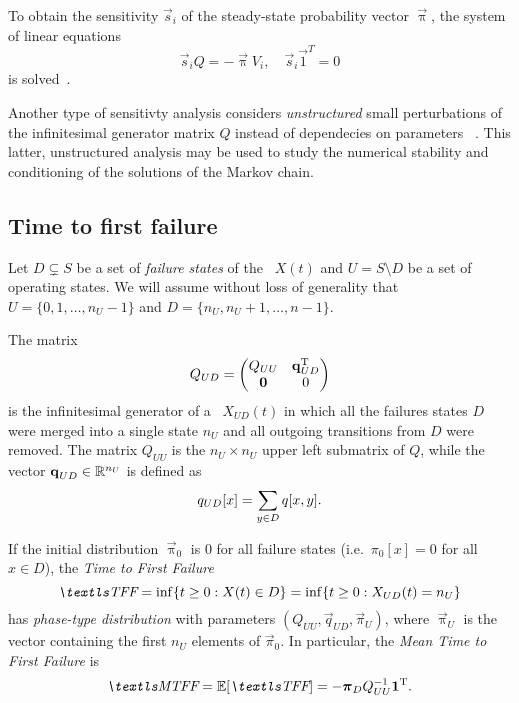 To obtain the sensitivity $\vec{s}_i$ of the steady-state probability
vector $\vec{\uppi}$, the system of linear equations
\begin{equation}
  \vec{s}_i Q = -\vec{\uppi} V_i, \quad \vec{s}_i \vec{1}^T = 0
\end{equation}
is solved~\citep{DBLP:conf/sigmetrics/BlakeRT88}.

Another type of sensitivty analysis considers \emph{unstructured}
small perturbations of the infinitesimal generator matrix $Q$ instead
of dependecies on parameters%
~\citep{funderlic1986sensitivity,ipsen1994uniform}. This latter,
unstructured analysis may be used to study the numerical stability and
conditioning of the solutions of the Markov chain.

\subsection{Time to first failure}

Let $D \subsetneq S$ be a set of \emph{failure states} of the \CTMC\ 
$X(t)$ and $U = S \setminus D$ be a set of operating states. We will
assume without loss of generality that $U = \{0, 1, \ldots, n_U - 1\}$
and $D = \{ n_U, n_U + 1, \ldots, n - 1 \}$.

The matrix
\begin{equation}
  Q_{UD} = \begin{pmatrix}
    Q_{UU} & \bm{\mathrm{q}}_{UD}^{\mathrm{T}} \\
    \bm{\mathrm{0}} & 0
  \end{pmatrix}
\end{equation}
is the infinitesimal generator of a \CTMC\ $X_{UD}(t)$ in which all
the failures states $D$ were merged into a single state $n_U$ and all
outgoing transitions from $D$ were removed. The matrix $Q_{UU}$ is the
$n_U \times n_U$ upper left submatrix of $Q$, while the vector
$\bm{\mathrm{q}}_{UD} \in \mathbb{R}^{n_U}$ is defined as
\begin{equation}
  q_{UD}[x] = \sum_{y \in D} q[x, y] \text.
\end{equation}

If the initial distribution $\vec{\uppi}_0$ is $0$ for all failure
states (i.e.~$\pi_0[x] = 0$ for all $x \in D$), the \emph{Time
  to First Failure}
\begin{equation}
  \TFF = \inf \{ t \ge 0 : X(t) \in D \} = \inf \{ t \ge 0 : X_{UD}(t)
  = n_U \}
\end{equation}
has \emph{phase-type distribution} with parameters
$(Q_{UU}, \vec{q}_{UD}, \vec{\pi}_{U})$, where $\vec{\uppi}_U$ is the
vector containing the first $n_U$ elements of $\vec{\pi}_0$. In
particular, the \emph{Mean Time to First Failure} is
\begin{equation}
  \MTFF = \Ex[\TFF] = - \vec{\pi}_D Q_{UU}^{-1} \vec{1}^\T \text.
\end{equation}

